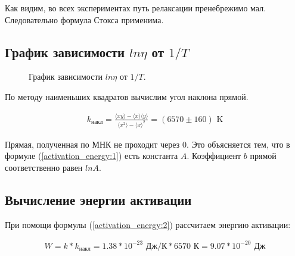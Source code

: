 \documentclass[a4paper]{article}
\begin{document}
    Как видим, во всех экспериментах путь релаксации пренебрежимо мал. Следовательно формула Стокса применима.

    \subsection{График зависимости $ln \eta$ от $1/T$}

    \begin{figure}[ht]
        \caption{График зависимости $ln \eta$ от $1/T$.}
        \label{graph}
    \end{figure}

    По методу наименьших квадратов вычислим угол наклона прямой.

    \begin{align*}
        k_{накл} = \frac{\langle xy \rangle - \langle x \rangle \langle y \rangle}{\langle x^2 \rangle - \langle x \rangle^2} = (6570 \pm 160) \text{ K}
    \end{align*}

    Прямая, полученная по МНК не проходит через 0. Это объясняется тем, что в формуле (\ref{activation_energy:1}) есть константа $A$. Коэффициент $b$ прямой соответственно равен $lnA$.

    \subsection{Вычисление энергии активации}

    При помощи формулы (\ref{activation_energy:2}) рассчитаем энергию активации:

    \begin{align*}
        W = k * k_\text{накл} = 1.38 * 10^{-23} \text{ Дж/К} * 6570 \text{ К} = 9.07 * 10^{-20} \text{ Дж}
    \end{align*}
\end{document}
